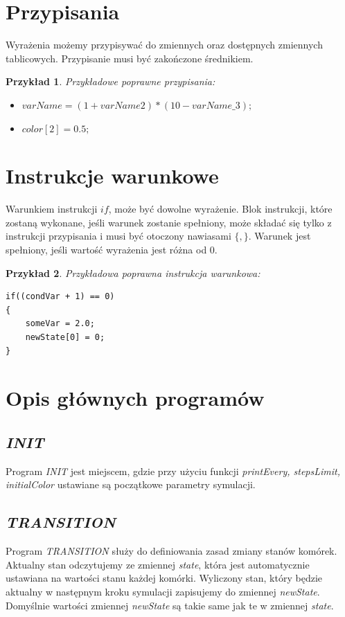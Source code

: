 \documentclass[declaration,shortabstract, inz]{iithesis}
\theoremstyle{definition} \newtheorem{definition}{Definicja}[]
\theoremstyle{plain} \newtheorem{remark}[definition]{Obserwacja}
\theoremstyle{plain} \newtheorem{theorem}[definition]{Twierdzenie}
\theoremstyle{plain} \newtheorem{example}{Przykład}[definition]
\theoremstyle{plain} \newtheorem{lemma}[definition]{Lemat}
\begin{document}
\section{Przypisania}
Wyrażenia możemy przypisywać do zmiennych oraz dostępnych zmiennych tablicowych. Przypisanie musi być zakończone średnikiem.

\begin{example}
Przykładowe poprawne przypisania:
\begin{itemize}
\item $varName = (1 + varName2) * (10 - varName\_3);$
\item $color[2] = 0.5;$
\end{itemize}
\end{example}

\section{Instrukcje warunkowe}
Warunkiem instrukcji $if$, może być dowolne wyrażenie. Blok instrukcji, które zostaną wykonane, jeśli warunek zostanie spełniony, może składać się tylko z instrukcji przypisania i musi być otoczony nawiasami $\{, \}$. Warunek jest spełniony, jeśli wartość wyrażenia jest różna od $0$.

\begin{example}
Przykładowa poprawna instrukcja warunkowa:
\begin{center}
\begin{lstlisting}
if((condVar + 1) == 0)
{
	someVar = 2.0;
	newState[0] = 0;
}
\end{lstlisting}
\end{center}
\end{example}

\section{Opis głównych programów}

\subsection{\textit{INIT}}
Program \textit{INIT} jest miejscem, gdzie przy użyciu funkcji \textit{printEvery, stepsLimit, initialColor} ustawiane są początkowe parametry symulacji.

\subsection{\textit{TRANSITION}}
Program \textit{TRANSITION} służy do definiowania zasad zmiany stanów komórek. Aktualny stan odczytujemy ze zmiennej \textit{state}, która jest automatycznie ustawiana na wartości stanu każdej komórki. Wyliczony stan, który będzie aktualny w następnym kroku symulacji zapisujemy do zmiennej \textit{newState}. Domyślnie wartości zmiennej \textit{newState} są takie same jak te w zmiennej \textit{state}.
\end{document}
